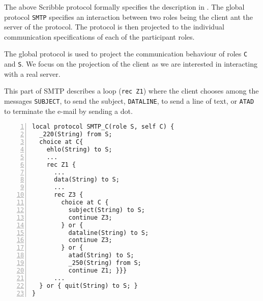 The above Scribble protocol formally specifies
the description in .
The global protocol \lstinline|SMTP| specifies
an interaction between two roles being the client ant the server of the protocol.
The protocol is then projected to the
individual communication specifications of each 
of the participant roles.

The global protocol is used to project the communication
behaviour of roles \lstinline|C| and \lstinline|S|.
We focus on the projection of the client as we are interested in interacting with a real server.

This part of SMTP describes a loop (\lstinline|rec Z1|) where the client chooses
among the messages \lstinline|SUBJECT|, to send the subject,
\lstinline|DATALINE|, to send a line of text, or \lstinline|ATAD| to terminate the e-mail by sending a dot.

\begin{lstlisting}[numbers=left]
local protocol SMTP_C(role S, self C) {
  _220(String) from S;
  choice at C{
    ehlo(String) to S;
    ...
    rec Z1 {
      ...
      data(String) to S;
      ...
      rec Z3 {
        choice at C {
          subject(String) to S;
          continue Z3;
        } or {
          dataline(String) to S;
          continue Z3;
        } or {
          atad(String) to S;
          _250(String) from S;
          continue Z1; }}}
      ...
  } or { quit(String) to S; }
}
\end{lstlisting}
%
